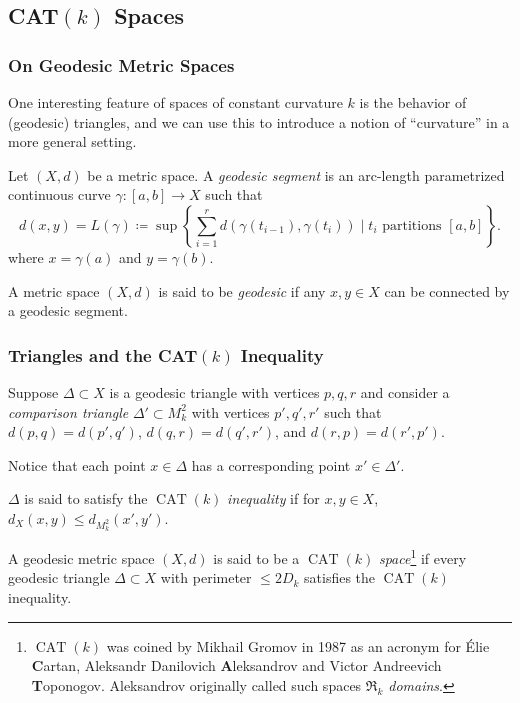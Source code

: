 \documentclass[handout]{beamer}
\DeclareMathOperator{\CAT}{CAT}
\theoremstyle{definition}
\begin{document}
\subsection{CAT$(k)$ Spaces}

\begin{frame}
    \frametitle{On Geodesic Metric Spaces}

    \pause
    One interesting feature of spaces of constant curvature $k$ is the behavior
    of (geodesic) triangles, and we can use this to introduce a notion of ``curvature''
    in a more general setting.

    \pause
    \begin{definition}
        Let $(X,d)$ be a metric space. A \emph{geodesic segment} is an arc-length parametrized
        continuous curve $\gamma : [a,b] \to X$ such that
        \[
          d(x,y) = L(\gamma)
          \coloneqq \sup\left\{\sum_{i=1}^r d(\gamma(t_{i-1}),\gamma(t_i))
          \mid t_i \text{ partitions } [a,b] \right\}.
        \]
        where $x = \gamma(a)$ and $y = \gamma(b)$.

        \pause
        A metric space $(X,d)$ is said to be \emph{geodesic} if any $x, y \in X$ can be connected
        by a geodesic segment.
    \end{definition}

\end{frame}

\begin{frame}
    \frametitle{Triangles and the CAT$(k)$ Inequality}

    \pause
    Suppose $\Delta \subset X$ is a geodesic triangle with vertices $p,q,r$ and consider a
    \emph{comparison triangle} $\Delta' \subset M_k^2$ with vertices $p',q',r'$ such that
    $d(p,q) = d(p',q')$, $d(q,r) = d(q',r')$, and $d(r,p) = d(r',p')$.

    Notice that each point $x \in \Delta$ has a corresponding point $x' \in \Delta'$.

    \pause
    $\Delta$ is said to satisfy the $\CAT(k)$
    \emph{inequality} if for $x, y \in X$, $d_X(x,y) \leq d_{M^2_k}(x',y')$.

    \pause
    \begin{definition}
        A geodesic metric space $(X,d)$ is said to be a $\CAT(k)$ \emph{space}\footnote{$\CAT(k)$
        was coined by Mikhail Gromov in 1987 as an acronym for Élie \textbf{C}artan,
        Aleksandr Danilovich \textbf{A}leksandrov and Victor Andreevich \textbf{T}oponogov.
        Aleksandrov originally called such spaces \emph{$\mathfrak{R}_k$ domains}.}
        if every geodesic triangle $\Delta \subset X$ with perimeter $\leq 2D_k$
        satisfies the $\CAT(k)$ inequality.
    \end{definition}

\end{frame}
\end{document}
